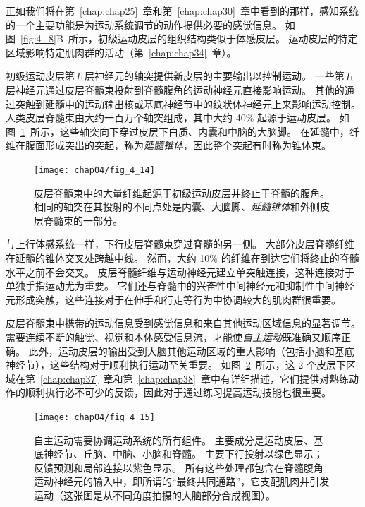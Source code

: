 正如我们将在第~\ref{chap:chap25}~章和第~\ref{chap:chap30}~章中看到的那样，感知系统的一个主要功能是为运动系统调节的动作提供必要的感觉信息。 
如图~\ref{fig:4_8}B~所示，初级运动皮层的组织结构类似于体感皮层。 
运动皮层的特定区域影响特定肌肉群的活动（第~\ref{chap:chap34}~章）。


初级运动皮层第五层神经元的轴突提供新皮层的主要输出以控制运动。
一些第五层神经元通过皮层脊髓束投射到脊髓腹角的运动神经元直接影响运动。
其他的通过突触到延髓中的运动输出核或基底神经节中的纹状体神经元上来影响运动控制。
人类皮层脊髓束由大约一百万个轴突组成，其中大约 40\% 起源于运动皮层。
如图~\ref{fig:4_14}~所示，这些轴突向下穿过皮层下白质、内囊和中脑的大脑脚。
在延髓中，纤维在腹面形成突出的突起，称为\textit{延髓锥体}，因此整个突起有时称为锥体束。


\begin{figure}[htbp]
	\centering
	\texttt{[image: chap04/fig\_4\_14]}
	\caption{皮层脊髓束中的大量纤维起源于初级运动皮层并终止于脊髓的腹角。
		相同的轴突在其投射的不同点处是内囊、大脑脚、\textit{延髓锥体}和外侧皮层脊髓束的一部分。}
	\label{fig:4_14}
\end{figure}


与上行体感系统一样，下行皮层脊髓束穿过脊髓的另一侧。 
大部分皮层脊髓纤维在延髓的锥体交叉处跨越中线。
然而，大约 10\% 的纤维在到达它们将终止的脊髓水平之前不会交叉。 
皮层脊髓纤维与运动神经元建立单突触连接，这种连接对于单独手指运动尤为重要。 
它们还与脊髓中的兴奋性中间神经元和抑制性中间神经元形成突触，这些连接对于在伸手和行走等行为中协调较大的肌肉群很重要。


皮层脊髓束中携带的运动信息受到感觉信息和来自其他运动区域信息的显著调节。
需要连续不断的触觉、视觉和本体感受信息流，才能使\textit{自主运动}既准确又顺序正确。
此外，运动皮层的输出受到大脑其他运动区域的重大影响（包括小脑和基底神经节），这些结构对于顺利执行运动至关重要。
如图~\ref{fig:4_15}~所示，这 2 个皮层下区域在第~\ref{chap:chap37}~章和第~\ref{chap:chap38}~章中有详细描述，它们提供对熟练动作的顺利执行必不可少的反馈，因此对于通过练习提高运动技能也很重要。

\begin{figure}[htbp]
	\centering
	\texttt{[image: chap04/fig\_4\_15]}
	\caption{自主运动需要协调运动系统的所有组件。
		主要成分是运动皮层、基底神经节、丘脑、中脑、小脑和脊髓。
		主要下行投射以绿色显示；
		反馈预测和局部连接以紫色显示。
		所有这些处理都包含在脊髓腹角运动神经元的输入中，即所谓的“最终共同通路”，它支配肌肉并引发运动（这张图是从不同角度拍摄的大脑部分合成视图）。}
	\label{fig:4_15}
\end{figure}



